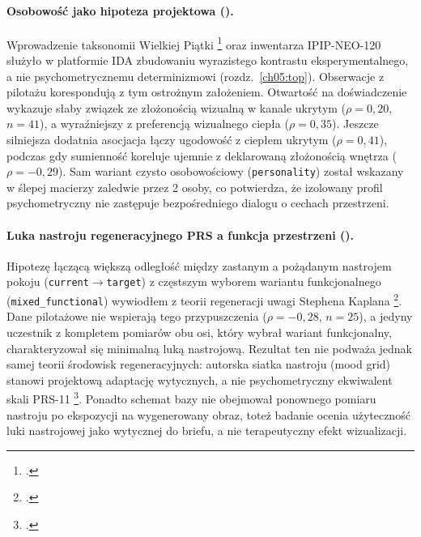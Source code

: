 \paragraph{Osobowość jako hipoteza projektowa ().}
Wprowadzenie taksonomii Wielkiej Piątki \footcite{john2008bigfive} oraz inwentarza IPIP-NEO-120 służyło w platformie IDA zbudowaniu wyrazistego kontrastu eksperymentalnego, a nie psychometrycznemu determinizmowi (rozdz.~\ref{ch05:top}). Obserwacje z pilotażu korespondują z tym ostrożnym założeniem. Otwartość na doświadczenie wykazuje słaby związek ze złożonością wizualną w kanale ukrytym ($\rho = 0{,}20$, $n=41$), a wyraźniejszy z preferencją wizualnego ciepła ($\rho = 0{,}35$). Jeszcze silniejsza dodatnia asocjacja łączy ugodowość z ciepłem ukrytym ($\rho = 0{,}41$), podczas gdy sumienność koreluje ujemnie z deklarowaną złożonością wnętrza ($\rho = -0{,}29$). Sam wariant czysto osobowościowy (\texttt{personality}) został wskazany w ślepej macierzy zaledwie przez 2 osoby, co potwierdza, że izolowany profil psychometryczny nie zastępuje bezpośredniego dialogu o cechach przestrzeni.

\paragraph{Luka nastroju regeneracyjnego PRS a funkcja przestrzeni ().}
Hipotezę łączącą większą odległość między zastanym a pożądanym nastrojem pokoju (\texttt{current}$\rightarrow$\texttt{target}) z częstszym wyborem wariantu funkcjonalnego (\texttt{mixed\_functional}) wywiodłem z teorii regeneracji uwagi Stephena Kaplana \footcite{kaplan1995restorative}. Dane pilotażowe nie wspierają tego przypuszczenia ($\rho = -0{,}28$, $n=25$), a jedyny uczestnik z kompletem pomiarów obu osi, który wybrał wariant funkcjonalny, charakteryzował się minimalną luką nastrojową. Rezultat ten nie podważa jednak samej teorii środowisk regeneracyjnych: autorska siatka nastroju (mood grid) stanowi projektową adaptację wytycznych, a nie psychometryczny ekwiwalent skali PRS-11 \footcite{hartig1997prs,pasini2014prs11}. Ponadto schemat bazy nie obejmował ponownego pomiaru nastroju po ekspozycji na wygenerowany obraz, toteż badanie ocenia użyteczność luki nastrojowej jako wytycznej do briefu, a nie terapeutyczny efekt wizualizacji.

